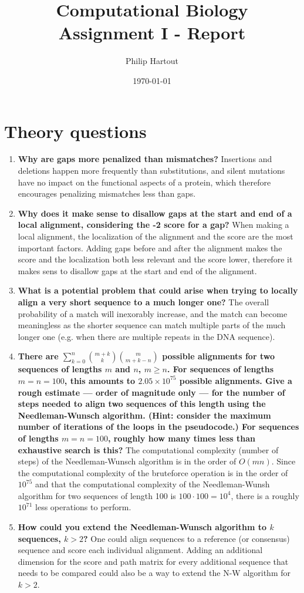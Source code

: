 \documentclass[a4paper,10pt,twoside]{article}
\title{Computational Biology \\ Assignment I - Report}
\author{Philip Hartout}
\date{\today}
\begin{document}
\maketitle

\section*{Theory questions}

\begin{enumerate}
    \item \textbf{Why are gaps more penalized than mismatches?} Insertions and deletions happen more frequently than substitutions, and silent mutations have no impact on the functional aspects of a protein, which therefore encourages penalizing mismatches less than gaps.
    
    \item \textbf{Why does it make sense to disallow gaps at the start and end of a local alignment, considering the -2 score for a gap?}
    When making a local alignment, the localization of the alignment and the score are the most important factors. Adding gaps before and after the alignment makes the score and the localization both less relevant and the score lower, therefore it makes sens to disallow gaps at the start and end of the alignment.  

    \item \textbf{What is a potential problem that could arise when trying to locally align a very short sequence to a much longer one?} The overall probability of a match will inexorably increase, and the match can become meaningless as the shorter sequence can match multiple parts of the much longer one (e.g. when there are multiple repeats in the DNA sequence).
 
    \item \textbf{There are $\sum_{k=0}^{n}{m+k \choose k}{m \choose m+k-n}$ possible alignments for two sequences of lengths $m$ and $n$, $m \geq n$. For sequences of lengths $m = n = 100$, this amounts to
    $2.05 × 10^{75}$ possible alignments. Give a rough estimate — order of magnitude only — for the number of steps needed to align two sequences of this length using the Needleman-Wunsch algorithm. (Hint: consider the maximum number of iterations of the loops in the pseudocode.) For sequences of lengths $m = n = 100$, roughly how many times less than exhaustive search is this?} The computational complexity (number of steps) of the Needleman-Wunsch algorithm is in the order of $O(mn)$.
    Since the computational complexity of the bruteforce operation is in the order of $10^{75}$ and that the  computational complexity of the Needleman-Wunsh algorithm for two sequences of length 100 is $100\cdot 100=10^4$, there is a roughly $10^{71}$ less operations to perform.
    \item \textbf{How could you extend the Needleman-Wunsch algorithm to $k$ sequences, $k > 2$?} One could align sequences to a reference (or consensus) sequence and score each individual alignment. Adding an additional dimension for the score and path matrix for every additional sequence that needs to be compared could also be a way to extend the N-W algorithm for $k>2$.  
\end{enumerate}
\end{document}
